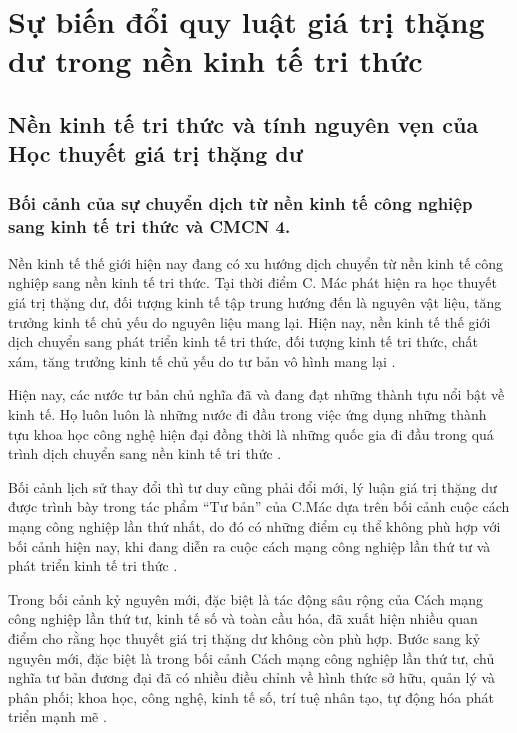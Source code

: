 \section{Sự biến đổi quy luật giá trị thặng dư trong nền kinh tế tri thức}

\subsection{Nền kinh tế tri thức và tính nguyên vẹn của Học thuyết giá trị thặng dư}

\subsubsection{Bối cảnh của sự chuyển dịch từ nền kinh tế công nghiệp sang kinh tế tri thức và CMCN 4.}

Nền kinh tế thế giới hiện nay đang có xu hướng dịch chuyển từ nền kinh tế công nghiệp sang nền kinh tế tri thức. Tại thời điểm C. Mác phát hiện ra học thuyết giá trị thặng dư, đối tượng kinh tế tập trung hướng đến là nguyên vật liệu, tăng trưởng kinh tế chủ yếu do nguyên liệu mang lại. Hiện nay, nền kinh tế thế giới dịch chuyển sang phát triển kinh tế tri thức, đối tượng kinh tế tri thức, chất xám, tăng trưởng kinh tế chủ yếu do tư bản vô hình mang lại \cite{tapchi_congthuong_gttd}.

Hiện nay, các nước tư bản chủ nghĩa đã và đang đạt những thành tựu nổi bật về kinh tế. Họ luôn luôn là những nước đi đầu trong việc ứng dụng những thành tựu khoa học công nghệ hiện đại đồng thời là những quốc gia đi đầu trong quá trình dịch chuyển sang nền kinh tế tri thức \cite{tapchi_congthuong_gttd}.

Bối cảnh lịch sử thay đổi thì tư duy cũng phải đổi mới, lý luận giá trị thặng dư được trình bày trong tác phẩm ``Tư bản'' của C.Mác dựa trên bối cảnh cuộc cách mạng công nghiệp lần thứ nhất, do đó có những điểm cụ thể không phù hợp với bối cảnh hiện nay, khi đang diễn ra cuộc cách mạng công nghiệp lần thứ tư và phát triển kinh tế tri thức \cite{do_the_tung_gttd}.

Trong bối cảnh kỷ nguyên mới, đặc biệt là tác động sâu rộng của Cách mạng công nghiệp lần thứ tư, kinh tế số và toàn cầu hóa, đã xuất hiện nhiều quan điểm cho rằng học thuyết giá trị thặng dư không còn phù hợp. Bước sang kỷ nguyên mới, đặc biệt là trong bối cảnh Cách mạng công nghiệp lần thứ tư, chủ nghĩa tư bản đương đại đã có nhiều điều chỉnh về hình thức sở hữu, quản lý và phân phối; khoa học, công nghệ, kinh tế số, trí tuệ nhân tạo, tự động hóa phát triển mạnh mẽ \cite{tran_hieu_gttd}.

